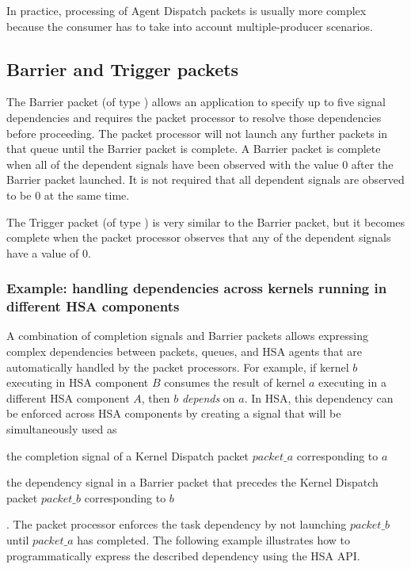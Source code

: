 \documentclass[final,oneside]{book}
\begin{document}


In practice, processing of Agent Dispatch packets is usually more
complex because the consumer has to take into account multiple-producer
scenarios.

\subsection{Barrier and Trigger packets}\label{barrier-packet}

The Barrier packet (of type ) allows an application
to specify up to five signal dependencies and requires the packet processor to
resolve those dependencies before proceeding. The packet processor will not
launch any further packets in that queue until the Barrier packet is complete. A
Barrier packet is complete when all of the dependent signals have been observed
with the value 0 after the Barrier packet launched. It is not required that all
dependent signals are observed to be 0 at the same time.

The Trigger packet (of type ) is very similar to
the Barrier packet, but it becomes complete when the packet processor observes
that any of the dependent signals have a value of 0.

\subsubsection{Example: handling dependencies across kernels running in
  different HSA components}
A combination of completion signals and Barrier packets allows expressing
complex dependencies between packets, queues, and HSA agents that are
automatically handled by the packet processors. For example, if kernel $b$
executing in HSA component $B$ consumes the result of kernel $a$ executing in a
different HSA component $A$, then $b$ \textit{depends} on $a$. In HSA, this
dependency can be enforced across HSA components by creating a signal that will
be simultaneously used as \begin{inparaenum}[1\upshape)] \item the completion
  signal of a Kernel Dispatch packet $packet\_a$ corresponding to $a$ \item the
  dependency signal in a Barrier packet that precedes the Kernel Dispatch packet
  $packet\_b$ corresponding to $b$\end{inparaenum}. The packet processor
enforces the task dependency by not launching $packet\_b$ until $packet\_a$ has
completed. The following example illustrates how to programmatically express the
described dependency using the HSA API.

\end{document}
